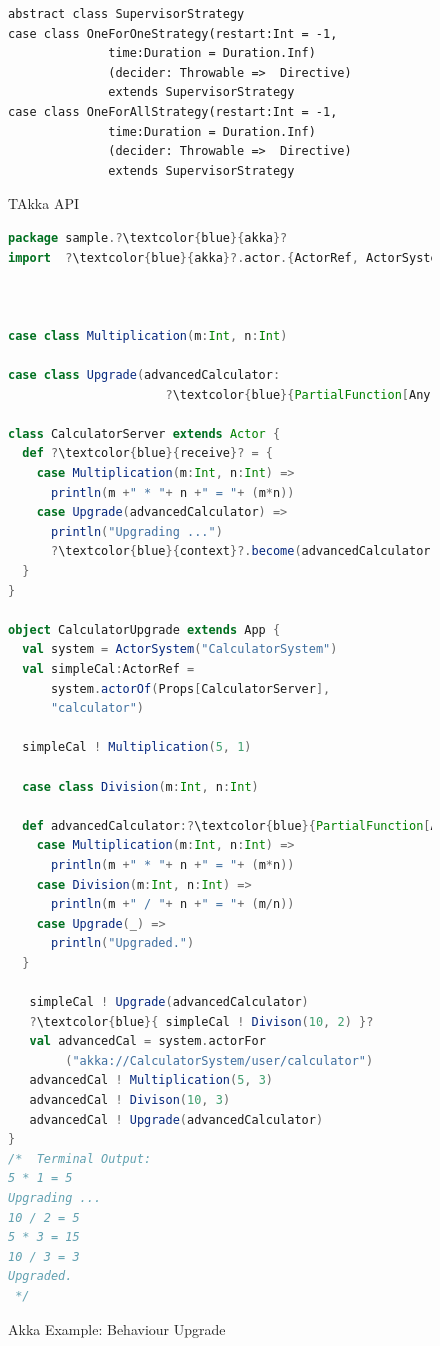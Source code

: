 \begin{figure}[!h]
    \begin{lstlisting}    
abstract class SupervisorStrategy
case class OneForOneStrategy(restart:Int = -1, 
              time:Duration = Duration.Inf)
              (decider: Throwable =>  Directive) 
              extends SupervisorStrategy
case class OneForAllStrategy(restart:Int = -1, 
              time:Duration = Duration.Inf)
              (decider: Throwable =>  Directive) 
              extends SupervisorStrategy
    \end{lstlisting}
    
    \caption{TAkka API}
    \vspace{-20pt }
\end{figure}



\begin{figure}[!h]
\begin{lstlisting}[language=scala,  escapechar=?]
package sample.?\textcolor{blue}{akka}?
import  ?\textcolor{blue}{akka}?.actor.{ActorRef, ActorSystem, Props, Actor}



case class Multiplication(m:Int, n:Int)

case class Upgrade(advancedCalculator:
                      ?\textcolor{blue}{PartialFunction[Any,Unit])}?

class CalculatorServer extends Actor { 
  def ?\textcolor{blue}{receive}? = {
    case Multiplication(m:Int, n:Int) => 
      println(m +" * "+ n +" = "+ (m*n))
    case Upgrade(advancedCalculator) =>
      println("Upgrading ...")
      ?\textcolor{blue}{context}?.become(advancedCalculator)    
  }
}

object CalculatorUpgrade extends App {
  val system = ActorSystem("CalculatorSystem") 
  val simpleCal:ActorRef = 
      system.actorOf(Props[CalculatorServer], 
      "calculator")
    
  simpleCal ! Multiplication(5, 1)
  
  case class Division(m:Int, n:Int) 
   
  def advancedCalculator:?\textcolor{blue}{PartialFunction[Any,Unit]}? = {
    case Multiplication(m:Int, n:Int) => 
      println(m +" * "+ n +" = "+ (m*n))
    case Division(m:Int, n:Int) => 
      println(m +" / "+ n +" = "+ (m/n))
    case Upgrade(_) =>
      println("Upgraded.")
  }  
     
   simpleCal ! Upgrade(advancedCalculator)    
   ?\textcolor{blue}{ simpleCal ! Divison(10, 2) }?   
   val advancedCal = system.actorFor
   		("akka://CalculatorSystem/user/calculator")   
   advancedCal ! Multiplication(5, 3) 
   advancedCal ! Divison(10, 3)
   advancedCal ! Upgrade(advancedCalculator)
}
/*  Terminal Output:
5 * 1 = 5
Upgrading ...
10 / 2 = 5
5 * 3 = 15
10 / 3 = 3
Upgraded.
 */
\end{lstlisting}
  \caption{Akka Example: Behaviour Upgrade}
  \label{fig:akka_swap} 
  \vspace{-10pt }
\end{figure}

